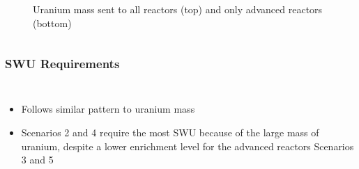 \begin{frame}
\begin{columns}
\begin{figure}
\begin{subfigure}
                \label{fig:fuel_advancedRX}
            \end{subfigure}
            \caption{Uranium mass sent to all reactors (top)
            and only advanced reactors (bottom)}
            \label{fig:fuel}
        \end{figure}
    \end{columns}
    

\end{frame}

\begin{frame}
    \frametitle{\gls{SWU} Requirements}
    \begin{columns}
        \column[t]{5cm}
            \begin{itemize}
                \item Follows similar pattern to uranium mass 
                \item Scenarios 2 and 4 require the most \gls{SWU} 
                      because of the large mass of uranium, despite a 
                      lower enrichment level for the advanced reactors 
                      Scenarios 3 and 5
                

\end{itemize}
\end{columns}
\end{frame}
